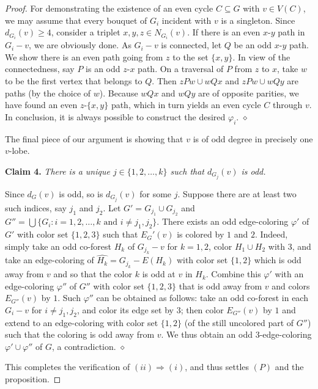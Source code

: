 \documentclass[a4paper,12pt]{article}
\numberwithin{equation}{section}
\begin{document}
\begin{proof}
For demonstrating the existence of an even cycle $C\subseteq G$ with $v\in V(C)$, we may assume that every bouquet of $G_i$ incident with $v$ is a singleton. Since $d_{G_i}(v)\geq4$, consider a triplet $x,y,z\in N_{G_i}(v)$. If there is an even $x$-$y$ path in $G_i-v$, we are obviously done. As $G_i-v$ is connected, let $Q$ be an odd $x$-$y$ path. We show there is an even path going from $z$ to the set $\{x,y\}$.  In view of the connectedness, say $P$ is an odd $z$-$x$ path. On a traversal of $P$ from $z$ to $x$, take $w$ to be the first vertex that belongs to $Q$.  Then $zPw\cup wQx$ and $zPw\cup wQy$ are paths (by the choice of $w$). Because $wQx$ and $wQy$ are of opposite parities, we have found an even $z$-$\{x,y\}$ path, which in turn yields an even cycle $C$ through $v$. In conclusion, it is always possible to construct the desired $\varphi_i$.
\hfill$\diamond$

\bigskip

The final piece of our argument is showing that $v$ is of odd degree in precisely one $v$-lobe.

\bigskip

\noindent \textbf{Claim 4.} \textit{There is a unique $j\in\{1,2,\ldots,k\}$ such that $d_{G_j}(v)$ is odd.}

\medskip

\noindent Since $d_G(v)$ is odd, so is $d_{G_j}(v)$ for some $j$. Suppose there are at least two such indices, say $j_1$ and $j_2$. Let $G'=G_{j_1}\cup G_{j_2}$ and $G''=\bigcup\{G_i:i=1,2,\ldots,k \text { and } i\neq j_1,j_2\}$. There exists an odd edge-coloring $\varphi'$ of $G'$ with color set $\{1,2,3\}$ such that $E_G'(v)$ is colored by $1$ and $2$. Indeed, simply take an odd co-forest $H_k$ of $G_{j_k}-v$ for $k=1,2$, color $H_1\cup H_2$ with $3$, and take an edge-coloring of $\hat{H_k}=G_{j_k}-E(H_k)$ with color set $\{1,2\}$ which is odd away from $v$ and so that the color $k$ is odd at $v$ in $\hat{H_k}$. Combine this $\varphi'$ with an edge-coloring $\varphi''$ of $G''$ with color set $\{1,2,3\}$ that is odd away from $v$ and colors $E_{G''}(v)$ by $1$. Such $\varphi''$ can be obtained as follows: take an odd co-forest in each $G_i-v$ for $i\neq j_1,j_2$, and color its edge set by $3$; then color $E_{G''}(v)$ by $1$ and extend to an edge-coloring with color set $\{1,2\}$ (of the still uncolored part of $G''$) such that the coloring is odd away from $v$. We thus obtain an odd $3$-edge-coloring $\varphi'\cup \varphi''$ of $G$, a contradiction.
\hfill$\diamond$

\bigskip

This completes the verification of $(ii)\Rightarrow(i)$, and thus settles $(P)$ and the proposition.
\end{proof}
\end{document}
